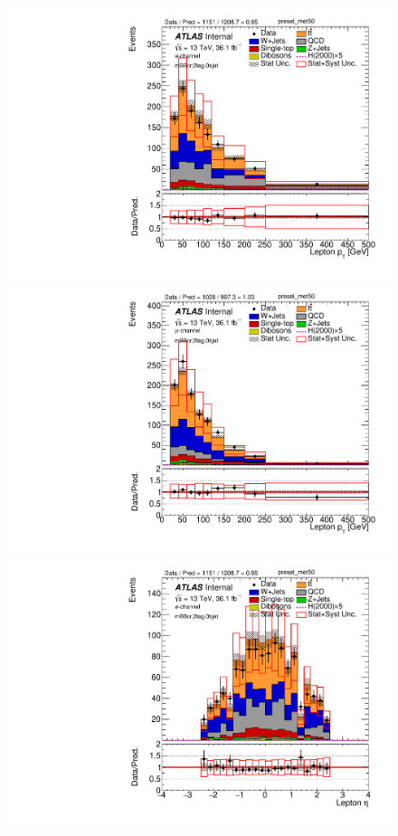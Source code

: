 \begin{figure}[!h]
\begin{center}
\includegraphics[scale=0.33]{./figures/boosted/PlotByChannels/DataMC_2tag_0bjet_mbbcr_elec_presel_met50_LepPt} 
\includegraphics[scale=0.33]{./figures/boosted/PlotByChannels/DataMC_2tag_0bjet_mbbcr_muon_presel_met50_LepPt} 
\includegraphics[scale=0.33]{./figures/boosted/PlotByChannels/DataMC_2tag_0bjet_mbbcr_elec_presel_met50_LepEta}                                                                                     

\end{center}
\end{figure}
